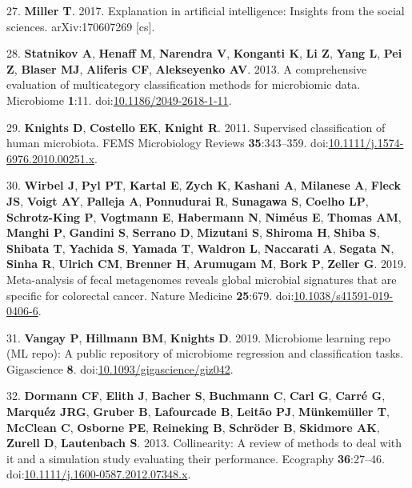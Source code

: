 \documentclass[11pt,]{article}
\begin{document}
\hypertarget{ref-miller_explanation_2017}{}
27. \textbf{Miller T}. 2017. Explanation in artificial intelligence:
Insights from the social sciences. arXiv:170607269 {[}cs{]}.

\hypertarget{ref-statnikov_comprehensive_2013}{}
28. \textbf{Statnikov A}, \textbf{Henaff M}, \textbf{Narendra V},
\textbf{Konganti K}, \textbf{Li Z}, \textbf{Yang L}, \textbf{Pei Z},
\textbf{Blaser MJ}, \textbf{Aliferis CF}, \textbf{Alekseyenko AV}. 2013.
A comprehensive evaluation of multicategory classification methods for
microbiomic data. Microbiome \textbf{1}:11.
doi:\href{https://doi.org/10.1186/2049-2618-1-11}{10.1186/2049-2618-1-11}.

\hypertarget{ref-knights_supervised_2011}{}
29. \textbf{Knights D}, \textbf{Costello EK}, \textbf{Knight R}. 2011.
Supervised classification of human microbiota. FEMS Microbiology Reviews
\textbf{35}:343--359.
doi:\href{https://doi.org/10.1111/j.1574-6976.2010.00251.x}{10.1111/j.1574-6976.2010.00251.x}.

\hypertarget{ref-wirbel_meta-analysis_2019}{}
30. \textbf{Wirbel J}, \textbf{Pyl PT}, \textbf{Kartal E}, \textbf{Zych
K}, \textbf{Kashani A}, \textbf{Milanese A}, \textbf{Fleck JS},
\textbf{Voigt AY}, \textbf{Palleja A}, \textbf{Ponnudurai R},
\textbf{Sunagawa S}, \textbf{Coelho LP}, \textbf{Schrotz-King P},
\textbf{Vogtmann E}, \textbf{Habermann N}, \textbf{Niméus E},
\textbf{Thomas AM}, \textbf{Manghi P}, \textbf{Gandini S},
\textbf{Serrano D}, \textbf{Mizutani S}, \textbf{Shiroma H},
\textbf{Shiba S}, \textbf{Shibata T}, \textbf{Yachida S}, \textbf{Yamada
T}, \textbf{Waldron L}, \textbf{Naccarati A}, \textbf{Segata N},
\textbf{Sinha R}, \textbf{Ulrich CM}, \textbf{Brenner H},
\textbf{Arumugam M}, \textbf{Bork P}, \textbf{Zeller G}. 2019.
Meta-analysis of fecal metagenomes reveals global microbial signatures
that are specific for colorectal cancer. Nature Medicine
\textbf{25}:679.
doi:\href{https://doi.org/10.1038/s41591-019-0406-6}{10.1038/s41591-019-0406-6}.

\hypertarget{ref-vangay_microbiome_2019}{}
31. \textbf{Vangay P}, \textbf{Hillmann BM}, \textbf{Knights D}. 2019.
Microbiome learning repo (ML repo): A public repository of microbiome
regression and classification tasks. Gigascience \textbf{8}.
doi:\href{https://doi.org/10.1093/gigascience/giz042}{10.1093/gigascience/giz042}.

\hypertarget{ref-dormann_collinearity:_2013}{}
32. \textbf{Dormann CF}, \textbf{Elith J}, \textbf{Bacher S},
\textbf{Buchmann C}, \textbf{Carl G}, \textbf{Carré G}, \textbf{Marquéz
JRG}, \textbf{Gruber B}, \textbf{Lafourcade B}, \textbf{Leitão PJ},
\textbf{Münkemüller T}, \textbf{McClean C}, \textbf{Osborne PE},
\textbf{Reineking B}, \textbf{Schröder B}, \textbf{Skidmore AK},
\textbf{Zurell D}, \textbf{Lautenbach S}. 2013. Collinearity: A review
of methods to deal with it and a simulation study evaluating their
performance. Ecography \textbf{36}:27--46.
doi:\href{https://doi.org/10.1111/j.1600-0587.2012.07348.x}{10.1111/j.1600-0587.2012.07348.x}.
\end{document}
